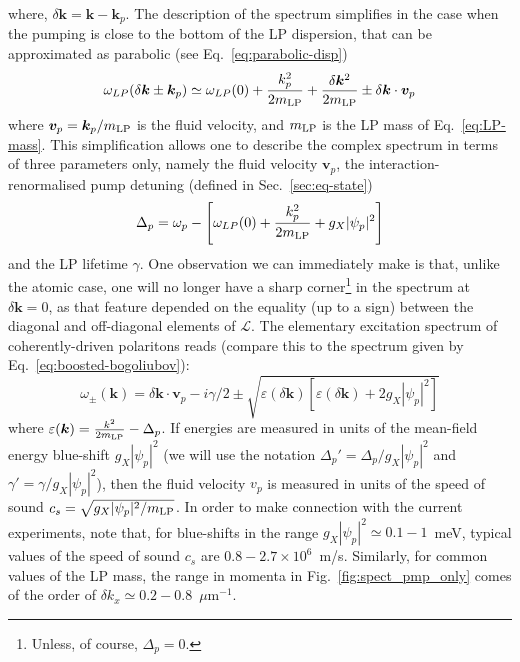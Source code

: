 %
where, $\delta \bm{k} = \bm{k} - \bm{k}_p$. The description of the
spectrum simplifies in the case when the pumping is close to the
bottom of the LP dispersion, that can be approximated as parabolic
(see Eq.~\eqref{eq:parabolic-disp})
%
\begin{equation}
  \omega_{LP} (\delta \bm{k} \pm \bm{k}_p) \simeq \omega_{LP}(0) +
  \frac{k_p^2}{2m_{\text{LP}}} + \frac{\delta \bm{k}^2}{2m_{\text{LP}}} \pm \delta \bm{k}
  \cdot \bm{v}_p
\end{equation}
%
where $\bm{v}_p=\bm{k}_p/m_{\text{LP}}$ is the fluid velocity, and
$m_{\text{LP}}$ is the LP mass of Eq.~\eqref{eq:LP-mass}. This
simplification allows one to describe the complex spectrum in terms of
three parameters only, namely the fluid velocity $\bm{v}_p$, the
interaction-renormalised pump detuning (defined in
Sec.~\ref{sec:eq-state})
%
\begin{equation}
  \Delta_p = \omega_p - \left[\omega_{LP} (0) +\frac{k_p^2}{2m_{\text{LP}}} +
    g_X|\psi_p|^2\right]
\end{equation}
%
and the LP lifetime $\gamma$. One observation we can immediately make
is that, unlike the atomic case, one will no longer have a sharp
corner\footnote{Unless, of course, $\Delta_p = 0$.}  in the spectrum
at $\delta \bm{k} = 0$, as that feature depended on the equality (up
to a sign) between the diagonal and off-diagonal elements of
$\mathcal{L}$.
%
The elementary excitation spectrum of coherently-driven polaritons
reads (compare this to the spectrum given by
Eq.~\eqref{eq:boosted-bogoliubov}):
%
\begin{equation}
  \omega_{\pm} (\bm{k}) = \delta \bm{k}\cdot \bm{v}_p - i\gamma/2
  \pm \sqrt{\varepsilon(\delta \bm{k}) \left[\varepsilon(\delta
      \bm{k}) + 2g_X|\psi_p|^2\right]}
\label{eq:spect}
\end{equation}
%
where $\varepsilon(\bm{k}) = \frac{k^2}{2m_{\text{LP}}} - \Delta_p$. If energies
are measured in units of the mean-field energy blue-shift $g_X
|\psi_p|^2$ (we will use the notation $\Delta_p' =
\Delta_p/g_X|\psi_p|^2$ and $\gamma'= \gamma/g_X|\psi_p|^2$), then the
fluid velocity $v_p$ is measured in units of the speed of sound $c_s =
\sqrt{g_X|\psi_p|^2/m_{\text{LP}}}$. In order to make connection with the current
experiments, note that, for blue-shifts in the range $g_X |\psi_p|^2
\simeq 0.1-1$~meV, typical values of the speed of sound $c_s$ are
$0.8-2.7\times 10^6$~m/s. Similarly, for common values of the LP mass,
the range in momenta in Fig.~\ref{fig:spect_pmp_only} comes of the order of
$\delta k_x \simeq 0.2-0.8$~$\mu$m${}^{-1}$.

